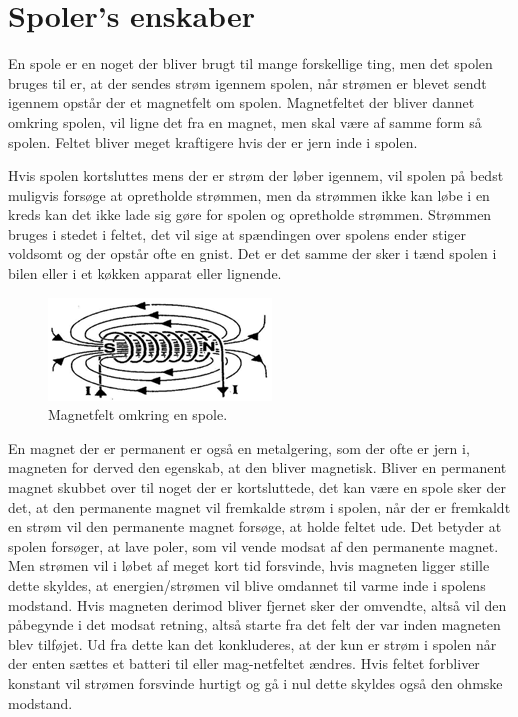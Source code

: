 \section{Spoler's enskaber}

En spole er en noget der bliver brugt til mange forskellige ting, men det spolen bruges til er, at der sendes strøm igennem spolen, når strømen er blevet sendt igennem opstår der et magnetfelt om spolen. Magnetfeltet der bliver dannet omkring spolen, vil ligne det fra en magnet, men skal være af samme form så spolen. Feltet bliver meget kraftigere hvis der er jern inde i spolen. 

Hvis spolen kortsluttes mens der er strøm der løber igennem, vil spolen på bedst muligvis forsøge at opretholde strømmen, men da strømmen ikke kan løbe i en kreds kan det ikke lade sig gøre for spolen og opretholde strømmen.  Strømmen bruges i stedet i feltet, det vil sige at spændingen over spolens ender stiger voldsomt og der opstår ofte en gnist. Det er det samme der sker i tænd spolen i bilen eller i et køkken apparat eller lignende.

\begin{figure}[htbp]
	\centering
	\includegraphics[width=0.5
	\textwidth]{Vildledning/Schematics/magnetfelt_omkring_en_spole.png}
	\caption{Magnetfelt omkring en spole.\cite{spoler}}
	\label{spole1}
\end{figure}

En magnet der er permanent er også en metalgering, som der ofte er jern i, magneten for derved den egenskab, at den bliver magnetisk.  Bliver en permanent magnet skubbet over til noget der er kortsluttede, det kan være en spole sker der det, at den permanente magnet vil fremkalde strøm i spolen, når der er fremkaldt en strøm vil den permanente magnet forsøge, at holde feltet ude. Det betyder at spolen forsøger, at lave poler, som vil vende modsat af den permanente magnet. Men strømen vil i løbet af meget kort tid forsvinde, hvis magneten ligger stille dette skyldes, at energien/strømen vil blive omdannet til varme inde i spolens modstand. Hvis magneten derimod bliver fjernet sker der omvendte, altså vil den påbegynde i det modsat retning, altså starte fra det felt der var inden magneten blev tilføjet. Ud fra dette kan det konkluderes, at der kun er strøm i spolen når der enten sættes et batteri til eller mag-netfeltet ændres. Hvis feltet forbliver konstant vil strømen forsvinde hurtigt og gå i nul dette skyldes også den ohmske modstand. 

